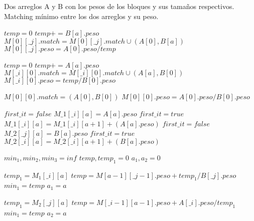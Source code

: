 \documentclass[12pt]{article}
\newcommand{\TITLE}[1]{\item[#1]}
\begin{document}
\begin{algorithmic}[1]
    \REQUIRE Dos arreglos A y B con los pesos de los bloques y sus tamaños respectivos.
    \ENSURE Matching mínimo entre los dos arreglos y su peso.
    \TITLE{\textsc{Min-Matching-Prod-Din}$(A,B,i,j)$}
        \STATE $temp = 0$
            \STATE $temp += B[a].peso$
            \STATE $M[0][\_j].match = M[0][\_j].match \cup (A[0],B[a])$
        \ENDFOR
        \STATE $M[0][\_j].peso = A[0].peso / temp$
    \ENDFOR
    
        \STATE $temp = 0$
            \STATE $temp += A[a].peso$
            \STATE $M[\_i][0].match = M[\_i][0].match \cup (A[a],B[0])$
        \ENDFOR
        \STATE $M[\_i][0].peso = temp / B[0].peso$
    \ENDFOR
    
    \STATE $M[0][0].match = (A[0], B[0])$
    \STATE $M[0][0].peso = A[0].peso / B[0].peso$
    
        \STATE $first\_it = false$
                \STATE $M\_1[\_i][a] = A[a].peso$
                \STATE $first\_it = true$
            \ELSE
                \STATE $M\_1[\_i][a] = M\_1[\_i][a + 1] + (A[a].peso)$
            \ENDIF
        \ENDFOR
    \ENDFOR
        \STATE $first\_it = false$
                \STATE $M\_2[\_j][a] = B[a].peso$
                \STATE $first\_it = true$
            \ELSE
                \STATE $M\_2[\_i][a] = M\_2[\_i][a + 1] + (B[a].peso)$
            \ENDIF
        \ENDFOR
    \ENDFOR
    
            \STATE $min_1, min_2, min_3 = inf$
            \STATE $temp, temp_1 = 0$
            \STATE $a_1, a_2 = 0$
            
                \STATE $temp_1 = M_1[\_i][a]$
                \STATE $temp = M[a - 1][\_j - 1].peso + temp_1 / B[\_j].peso$
                    \STATE $min_1 = temp$
                    \STATE $a_1 = a$
                \ENDIF
            \ENDFOR
            
                \STATE $temp_1 = M_2[\_j][a]$
                \STATE $temp = M[\_i - 1][a - 1].peso + A[\_i].peso / temp_1$
                    \STATE $min_1 = temp$
                    \STATE $a_2 = a$
                \ENDIF
            \ENDFOR
            

\end{algorithmic}
\end{document}
